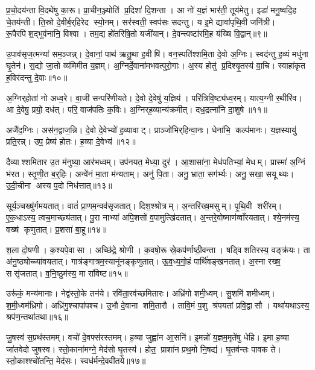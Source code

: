 प्र॒चो॒दय॑न्ता वि॒दथे॑षु का॒रू। प्रा॒चीन॒ञ्ज्योति॑ प्र॒दिशा॑ दि॒शन्ता। आ नो॑ य॒ज्ञं भार॑ती॒ तूय॑मेतु। इडा॑ मनु॒ष्वदि॒ह चे॒तय॑न्ती। ति॒स्रो दे॒वीर्ब॒र्‌हिरेद स्यो॒नम्। सर॑स्वती॒ स्वप॑सः सदन्तु। य इ॒मे द्यावा॑पृथि॒वी जनि॑त्री। रू॒पैरपिश॒द्भुव॑नानि॒ विश्वा। तम॒द्य हो॑तरिषि॒तो यजी॑यान्। दे॒वन्त्वष्टा॑रमि॒ह य॑ख्षि वि॒द्वान्॥९॥

उ॒पाव॑सृज॒त्मन्या॑ सम॒ञ्जन्न्। दे॒वानां॒ पाथ॑ ऋतु॒था ह॒वीषि॑। वन॒स्पति॑श्शमि॒ता दे॒वो अ॒ग्निः। स्वद॑न्तु ह॒व्यं मधु॑ना घृ॒तेन॑। स॒द्यो जा॒तो व्य॑मिमीत य॒ज्ञम्। अ॒ग्निर्दे॒वाना॑मभवत्पुरो॒गाः। अ॒स्य होतु॑ प्र॒दिश्यृ॒तस्य॑ वा॒चि। स्वाहा॑कृत ह॒विर॑दन्तु दे॒वाः॥१०॥\anuvakamend[य॒ज्ञैः स्यो॒नं यज॑ध्यै वि॒द्वान॒ष्टौ च॑]

अ॒ग्निर्‌होता॑ नो अध्व॒रे। वा॒जी सन्परि॑णीयते। दे॒वो दे॒वेषु॑ य॒ज्ञिय॑। परि॑त्रिवि॒ष्ट्य॑ध्व॒रम्। यात्य॒ग्नी र॒थीरि॑व। आ दे॒वेषु॒ प्रयो॒ दध॑त्। परि॒ वाज॑पतिः क॒विः। अ॒ग्निर्‌ह॒व्यान्य॑क्रमीत्। दध॒द्रत्ना॑नि दा॒शुषे॥११॥\anuvakamend[अ॒ग्निर्‌होता॑ नो॒ नव॑]

अजै॑द॒ग्निः। अस॑न॒द्वाज॒न्नि। दे॒वो दे॒वेभ्यो॑ ह॒व्यावाट्। प्राञ्जो॑भिर्‌हिन्वा॒नः। धेना॑भि॒ कल्प॑मानः। य॒ज्ञस्यायु॑ प्रति॒रन्न्। उप॒ प्रेष्य॑ होतः। ह॒व्या दे॒वेभ्य॑॥१२॥\anuvakamend[अजै॑द॒ष्टौ]

दैव्याश्शमितार उ॒त म॑नुष्या॒ आर॑भध्वम्। उप॑नयत॒ मेध्या॒ दुर॑। आ॒शासा॑ना॒ मेध॑पतिभ्यां॒ मेधम्। प्रास्मा॑ अ॒ग्निं भ॑रत। स्तृ॒णी॒त ब॒र्॒हिः। अन्वे॑नं मा॒ता म॑न्यताम्। अनु॑ पि॒ता। अनु॒ भ्राता॒ सग॑र्भ्यः। अनु॒ सखा॒ सयूथ्यः। उ॒दी॒चीना अस्य प॒दो निध॑त्तात्॥१३॥

सूर्य॒ञ्चख्षु॑र्गमयतात्। वातं॑ प्रा॒णम॒न्वव॑सृजतात्। दिश॒श्श्रोत्रम्। अ॒न्तरि॑ख्ष॒मसुम्। पृ॒थि॒वी शरी॑रम्। ए॒क॒धाऽस्य॒ त्वच॒माच्छ्य॑तात्। पु॒रा नाभ्या॑ अपि॒शसो॑ व॒पामुत्खि॑दतात्। अ॒न्तरे॒वोष्माण॑व्वाँरयतात्। श्ये॒नम॑स्य॒ वख्ष॑ कृणुतात्। प्र॒शसा॑ बा॒हू॥१४॥

श॒ला दो॒षणी। क॒श्यपे॒वासा। अच्छि॑द्रे॒ श्रोणी। क॒वषो॒रू स्रे॒कप॑र्णाष्ठी॒वन्ता। षड्विशतिरस्य॒ वङ्क्र॑यः। ता अ॑नु॒ष्ठ्योच्च्या॑वयतात्। गात्र॑ङ्गात्रम॒स्यानू॑नङ्कृणुतात्। ऊ॒व॒ध्य॒गो॒हं पार्थि॑वङ्खनतात्। अ॒स्ना रख्ष॒ ससृ॑जतात्। व॒नि॒ष्ठुम॑स्य॒ मा रा॑विष्ट॥१५॥

उरू॑कं॒ मन्य॑मानाः। नेद्व॑स्तो॒के तन॑ये। रवि॑ता॒रव॑च्छमितारः। अध्रि॑गो शमी॒ध्वम्। सु॒शमि॑ शमीध्वम्। श॒मी॒ध्वम॑ध्रिगो। अध्रि॑गु॒श्चापा॑पश्च। उ॒भौ दे॒वाना शमि॒तारौ। तावि॒मं प॒शु श्र॑पयतां प्रवि॒द्वासौ। यथा॑यथाऽस्य॒ श्रप॑ण॒न्तथा॑तथा॥१६॥\anuvakamend[ध॒त्ता॒द्बा॒हू मा रा॑विष्ट॒ तथा॑तथा]

जु॒षस्व॑ स॒प्रथ॑स्तमम्। वचो॑ दे॒वफ्स॑रस्तमम्। ह॒व्या जुह्वा॑न आ॒सनि॑। इ॒मन्नो॑ य॒ज्ञम॒मृते॑षु धेहि। इ॒मा ह॒व्या जा॑तवेदो जुषस्व। स्तो॒काना॑मग्ने॒ मेद॑सो घृ॒तस्य॑। होत॒ प्राशा॑न प्रथ॒मो नि॒षद्य॑। घृ॒तव॑न्तः पावक ते। स्तो॒काश्श्चो॑तन्ति॒ मेद॑सः। स्वध॑र्मन्दे॒ववी॑तये॥१७॥

